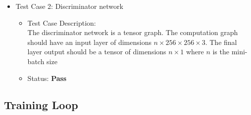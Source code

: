 \documentclass[oneside,a4paper,12pt]{report}
\begin{document}
\begin{itemize}
\begin{itemize}
		\item Test Case 2: Discriminator network
		\begin{itemize}
			\item Test Case Description:\\
			The discriminator network is a tensor graph. The computation graph should have an input layer of dimensions $n \times 256 \times 256 \times 3$. The final layer output should be a tensor of dimensions $n \times 1$ where $n$ is the mini-batch size
			\item Status: \textbf{Pass}
		\end{itemize}
	\end{itemize}
\end{itemize}

\subsection{Training Loop}
\end{document}
